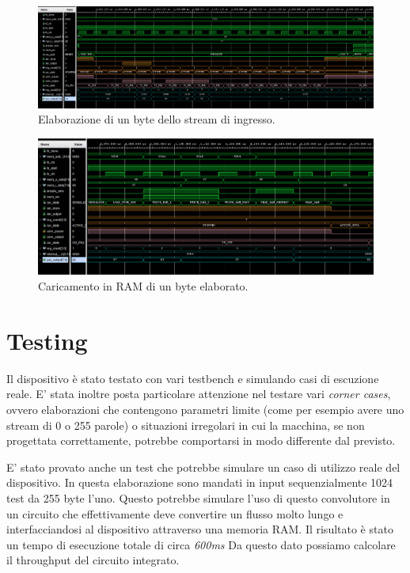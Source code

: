 \documentclass[a4paper]{report}
\begin{document}
\begin{figure}[H]
  \centering
  \label{fig:Convoluzione}
  \includegraphics[scale = 0.25]{schematics/Byte elabora.png}
  \caption{Elaborazione di un byte dello stream di ingresso.}
\end{figure}

\begin{figure}[H]
  \centering
  \label{fig:Caricamento ram}
  \includegraphics[scale = 0.25]{schematics/Caricamento in ram.png}
  \caption{Caricamento in RAM di un byte elaborato.}
\end{figure}

\section{Testing}
Il dispositivo è stato testato con vari testbench e simulando casi di escuzione reale. E' stata inoltre posta particolare attenzione nel testare vari \textit{corner cases}, ovvero elaborazioni che contengono parametri limite (come per esempio avere uno stream di 0 o 255 parole) o situazioni irregolari in cui la macchina, se non progettata correttamente, potrebbe comportarsi in modo differente dal previsto.

E' stato provato anche un test che potrebbe simulare un caso di utilizzo reale del dispositivo. In questa elaborazione sono mandati in input sequenzialmente 1024 test da 255 byte l'uno. Questo potrebbe simulare l'uso di questo convolutore in un circuito che effettivamente deve convertire un flusso molto lungo e interfacciandosi al dispositivo attraverso una memoria RAM.
Il risultato è stato un tempo di esecuzione totale di circa \textit{600ms}
Da questo dato possiamo calcolare il throughput del circuito integrato.
\end{document}

